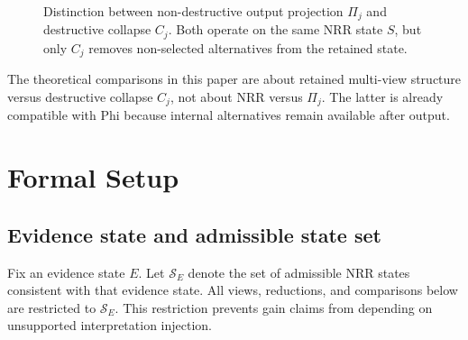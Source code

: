 \documentclass[11pt,a4paper]{article}
\begin{document}
\begin{figure}[t]
\centering
{}
\caption{Distinction between non-destructive output projection $\Pi_j$ and destructive collapse $C_j$. Both operate on the same NRR state $S$, but only $C_j$ removes non-selected alternatives from the retained state.}
\label{fig:projection_vs_collapse}
\end{figure}

The theoretical comparisons in this paper are about retained multi-view structure versus destructive collapse $C_j$, not about NRR versus $\Pi_j$. The latter is already compatible with Phi because internal alternatives remain available after output.

\section{Formal Setup}
\label{sec:setup}

\subsection{Evidence state and admissible state set}

Fix an evidence state $E$. Let $\mathcal{S}_E$ denote the set of admissible NRR states consistent with that evidence state. All views, reductions, and comparisons below are restricted to $\mathcal{S}_E$. This restriction prevents gain claims from depending on unsupported interpretation injection.
\end{document}
